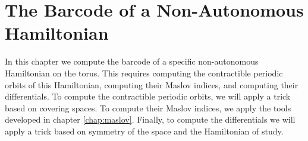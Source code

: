 \chapter{The Barcode of a Non-Autonomous Hamiltonian}
\label{chap:firstexample}

In this chapter we compute the barcode of a specific non-autonomous Hamiltonian on the torus. This requires computing the contractible periodic orbits of this Hamiltonian, computing their Maslov indices, and computing their differentials. To compute the contractible periodic orbits, we will apply a trick based on covering spaces. To compute their Maslov indices, we apply the tools developed in chapter \ref{chap:maslov}. Finally, to compute the differentials we will apply a trick based on symmetry of the space and the Hamiltonian of study.


